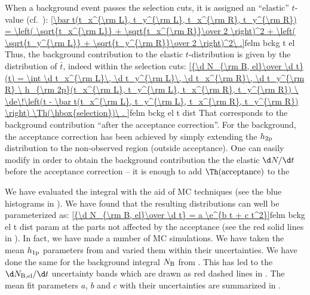 When a background event passes the selection cuts, it is assigned an ``elastic'' $t$-value (cf.~):
\eqref{\bar t(t_x^{\rm L}, t_y^{\rm L}, t_x^{\rm R}, t_y^{\rm R})
= \left( \sqrt{t_x^{\rm L}} + \sqrt{t_x^{\rm R}}\over 2 \right)^2 + \left( \sqrt{t_y^{\rm L}} + \sqrt{t_y^{\rm R}}\over 2 \right)^2\ .}{felm bckg t el}
Thus, the background contribution to the elastic $t$-distribution is given by the distribution of $\bar t$, indeed within the selection cuts:
\eqref{{\d N_{\rm B, el}\over \d t}(t) = \int
	\d t_x^{\rm L}\, \d t_y^{\rm L}\, \d t_x^{\rm R}\, \d t_y^{\rm R}
	\ h_{\rm 2p}(t_x^{\rm L}, t_y^{\rm L}, t_x^{\rm R}, t_y^{\rm R})
	\ \de\!\left(t - \bar t(t_x^{\rm L}, t_y^{\rm L}, t_x^{\rm R}, t_y^{\rm R}) \right)
	\Th(\hbox{selection})\ .
}{felm bckg el t dist}
That corresponds to the background contribution ``after the acceptance correction''. For the background, the acceptance correction has been achieved by simply extending the $h_{\rm 2p}$ distribution to the non-observed region (outside acceptance). One can easily modify  in order to obtain the background contribution the the elastic $\d N/\d t$ before the acceptance correction -- it is enough to add $\Th(\hbox{acceptance})$ to the \rhs

We have evaluated the integral  with the aid of MC techniques (see the blue histograms in ). We have found that the resulting distributions can well be parameterized as:
\eqref{{\d N_{\rm B, el}\over \d t} = a \e^{b t + c t^2}}{felm bckg el t dist param}
at the parts not affected by the acceptance (see the red solid lines in ). In fact, we have made a number of MC simulations. We have taken the mean $h_{\rm 1p}$ parameters from  and varied them within their uncertainties. We have done the same for the background integral $N_{\rm B}$ from . This has led to the $\d N_{\rm B,el}/\d t$ uncertainty bands which are drawn as red dashed lines in . The mean fit parameters $a$, $b$ and $c$ with their uncertainties are summarized in .



